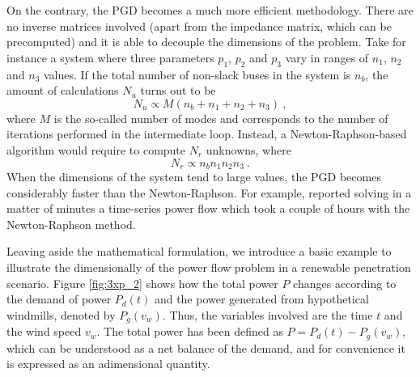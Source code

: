 On the contrary, the PGD becomes a much more efficient methodology. There are no inverse matrices involved (apart from the impedance matrix, which can be precomputed) and it is able to decouple the dimensions of the problem. Take for instance a system where three parameters $p_1$, $p_2$ and $p_3$ vary in ranges of $n_1$, $n_2$ and $n_3$ values. If the total number of non-slack buses in the system is $n_b$, the amount of calculations $N_u$ turns out to be
\begin{equation}
   N_u \propto M (n_b + n_1 + n_2 + n_3) \ ,
\label{eq:n_unk_pgd}
\end{equation}
where $M$ is the so-called number of modes and corresponds to the number of iterations performed in the intermediate loop. Instead, a Newton-Raphson-based algorithm would require to compute $N_r$ unknowns, where 
\begin{equation}
   N_r \propto n_bn_1n_2n_3  \ .
\label{eq:n_unk_nr}
\end{equation}
When the dimensions of the system tend to large values, the PGD becomes considerably faster than the Newton-Raphson. For example, \cite{blanco2017efficient} reported solving in a matter of minutes a time-series power flow which took a couple of hours with the Newton-Raphson method.  

Leaving aside the mathematical formulation, we introduce a basic example to illustrate the dimensionally of the power flow problem in a renewable penetration scenario. Figure \ref{fig:3xp_2} shows how the total power $P$ changes according to the demand of power $P_d(t)$ and the power generated from hypothetical windmills, denoted by $P_g(v_w)$. Thus, the variables involved are the time $t$ and the wind speed $v_w$. The total power has been defined as $P=P_d(t)-P_g(v_w)$, which can be understood as a net balance of the demand, and for convenience it is expressed as an adimensional quantity.



